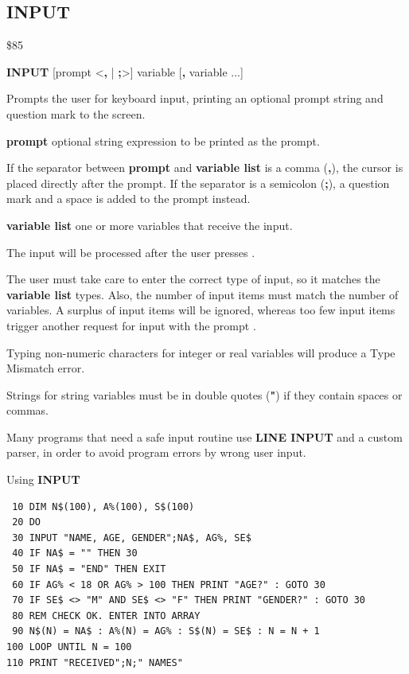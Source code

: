 \subsection{INPUT}
\begin{description}[leftmargin=2cm,style=nextline]
\item [Token:]    \$85

\item [Format:]   {\bf INPUT} [prompt <{\bf,} | {\bf;}>] variable [{\bf,} variable ...]

\item [Usage:]    Prompts the user for keyboard input, printing an optional prompt string and question mark to the screen.

                  {\bf prompt} optional string expression to be printed as the prompt.

                  If the separator between {\bf prompt} and {\bf variable list} is a comma ({\bf ,}), the cursor is placed directly after the prompt. If the separator is a semicolon ({\bf ;}), a question mark and a space is added to the prompt instead.

                  {\bf variable list} one or more variables that receive the input.

                  The input will be processed after the user presses .

\item [Remarks:]  The user must take care to enter the correct type of input, so it matches the {\bf variable list} types. Also, the number of input items must match the number of variables. A surplus of input items will be ignored, whereas too few input items trigger another request for input with the prompt .

                  Typing non-numeric characters for integer or real variables will produce a Type Mismatch error.

                  Strings for string variables must be in double quotes ({\bf "}) if they contain spaces or commas.

                  Many programs that need a safe input routine use {\bf LINE INPUT} and a custom parser, in order to avoid program errors by wrong user input.

\item [Example:]  Using {\bf INPUT}

\begin{tcolorbox}[colback=black,coltext=white]
\verbatimfont{\codefont}
\begin{verbatim}
 10 DIM N$(100), A%(100), S$(100)
 20 DO
 30 INPUT "NAME, AGE, GENDER";NA$, AG%, SE$
 40 IF NA$ = "" THEN 30
 50 IF NA$ = "END" THEN EXIT
 60 IF AG% < 18 OR AG% > 100 THEN PRINT "AGE?" : GOTO 30
 70 IF SE$ <> "M" AND SE$ <> "F" THEN PRINT "GENDER?" : GOTO 30
 80 REM CHECK OK. ENTER INTO ARRAY
 90 N$(N) = NA$ : A%(N) = AG% : S$(N) = SE$ : N = N + 1
100 LOOP UNTIL N = 100
110 PRINT "RECEIVED";N;" NAMES"
\end{verbatim}
\end{tcolorbox}
\end{description}

